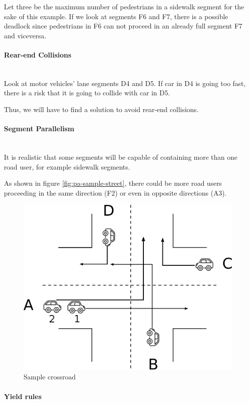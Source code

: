 Let three be the maximum number of pedestrians in a sidewalk segment for the
sake of this example.
If we look at segments F6 and F7, there is a possible deadlock since
pedestrians in F6 can not proceed in an already full segment F7 and viceversa.

\paragraph{Rear-end Collisions} \mbox{} \\

Look at motor vehicles' lane segments D4 and D5. If car in D4 is going too
fast, there is a risk that it is going to collide with car in D5.

Thus, we will have to find a solution to avoid rear-end collisions.

\paragraph{Segment Parallelism} \mbox{} \\

It is realistic that some segments will be capable of containing more than one
road user, for example sidewalk segments.

As shown in figure \ref{fig:pa-sample-street}, there could be more road users
proceeding in the same direction (F2) or even in opposite directions (A3).

\begin{figure}[H]
  \centering
  \includegraphics[width=.6\columnwidth]{images/analysis/crossroads.eps}
  \caption{Sample crossroad}
  \label{fig:pa-sample-crossroad}
\end{figure}

\paragraph{Yield rules} \mbox{} \\

